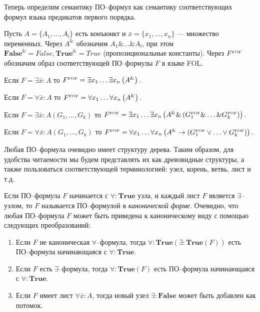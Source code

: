 Теперь определим семантику ПО--формул как семантику соответствующих формул языка предикатов первого порядка.

\begin{definition}\label{def:semantic}
Пусть $A = \{A_1,\ldots,A_l\}$ есть конъюнкт и $\bar{x} = \{x_1,\ldots,x_n\}$ --- множество переменных. Через $A^{\&}$ обозначим $A_1 \&\ldots\&A_l$, при этом $\boldsymbol{False}^{\&}= False, \boldsymbol{True}^{\&}=True$ (пропозициональные константы). Через $F^{\text{\tiny{FOF}}}$ обозначим образ соответствующей ПО--формулы $F$ в языке FOL.

Если $F= \exists \bar{x}\colon A$ то $F^{\text{\tiny{FOF}}} = \exists x_1 \ldots \exists x_n \left(A^{\&}\right).$

Если $F = \forall \bar{x}\colon A$ то $F^{\text{\tiny{FOF}}} = \forall x_1 \ldots \forall x_n \left(A^{\&}\right).$

Если $F = \exists \bar{x}\colon A\left(G_1,\ldots,G_k\right)$ то $F^{\text{\tiny{FOF}}} = \exists x_1 \ldots \exists x_n  \left(A^{\&} \& \left(G_{1}^{\text{\tiny{FOF}}} \& \ldots \& G_{k}^{\text{\tiny{FOF}}}\right)\right).$

Если $F = \forall \bar{x}\colon A\left(G_1,\ldots,G_k\right)$ то $F^{\text{\tiny{FOF}}} = \forall x_1 \ldots \forall x_n \left(A^{\&}\rightarrow \left(G_{1}^{\text{\tiny{FOF}}} \vee\ldots\vee G_{k}^{\text{\tiny{FOF}}}\right)\right).$

\end{definition}

Любая ПО--формула очевидно имеет структуру дерева. Таким образом, для удобства читаемости мы будем представлять их как древовидные структуры, а также пользоваться соответствующей терминологией: узел, корень, ветвь, лист и т.д.

Если ПО--формула $F$ начинается с $\forall\colon\boldsymbol{True}$ узла, и каждый лист $F$ является $\exists$--узлом, то $F$ называется ПО--формулой в {\em канонической форме}.
Очевидно, что любая ПО--формула $F$ может быть приведена к каноническому виду с помощью следующих преобразований:
\begin{enumerate}
\item Если $F$ не каноническая $\forall$--формула, тогда $\forall\colon \boldsymbol{True}\left(\exists\colon \boldsymbol{True}\left(F\right)\right)$ есть ПО--формула начинающаяся с $\forall\colon\boldsymbol{True}$.
\item Если $F$ есть $\exists$--формула, тогда $\forall\colon \boldsymbol{True}\left(F\right)$ есть ПО--формула начинающаяся с $\forall\colon\boldsymbol{True}$.
\item Если $F$ имеет лист $\forall \bar{x}\colon A$, тогда новый узел $\exists\colon\boldsymbol{False}$ может быть добавлен как потомок.
\end{enumerate}

